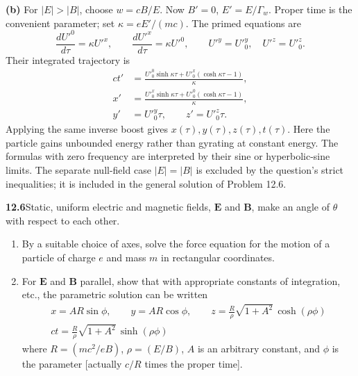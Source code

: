\medskip\noindent\textbf{(b)} For $|E|>|B|$, choose $w=cB/E$.  Now
$B'=0$, $E'=E/\Gamma_w$.  Proper time is the convenient parameter;
set $\kappa=eE'/(mc)$.  The primed equations are
\[
\frac{dU'^0}{d\tau}=\kappa U'^x,\qquad
\frac{dU'^x}{d\tau}=\kappa U'^0,\qquad
U'^y=U'^y_0,\quad U'^z=U'^z_0.
\]
Their integrated trajectory is
\begin{align*}
ct'&=\frac{U'^0_0\sinh\kappa\tau+
 U'^x_0(\cosh\kappa\tau-1)}{\kappa},\\
x'&=\frac{U'^x_0\sinh\kappa\tau+
 U'^0_0(\cosh\kappa\tau-1)}{\kappa},\\
y'&=U'^y_0\tau,\qquad z'=U'^z_0\tau.
\end{align*}
Applying the same inverse boost gives $x(\tau),y(\tau),z(\tau),t(\tau)$.
Here the particle gains unbounded energy rather than gyrating at
constant energy.  The formulas with zero frequency are interpreted
by their sine or hyperbolic-sine limits.  The separate null-field
case $|E|=|B|$ is excluded by the question's strict inequalities;
it is included in the general solution of Problem 12.6.

\par\bigskip
\noindent\textbf{12.6}\quad Static, uniform electric and magnetic fields, $\mathbf{E}$ and $\mathbf{B}$, make an angle of $\theta$ with respect to each other.
\begin{enumerate}
\item[(a)] By a suitable choice of axes, solve the force equation for the motion of a particle of charge $e$ and mass $m$ in rectangular coordinates.
\item[(b)] For $\mathbf{E}$ and $\mathbf{B}$ parallel, show that with appropriate constants of integration, etc., the parametric solution can be written
\begin{gather*}
x=AR\sin\phi,\qquad y=AR\cos\phi,\qquad z=\frac{R}{\rho}\sqrt{1+A^{2}}\,\cosh(\rho\phi)\\[4pt]
ct=\frac{R}{\rho}\sqrt{1+A^{2}}\,\sinh(\rho\phi)
\end{gather*}
where $R=(mc^{2}/eB)$, $\rho=(E/B)$, $A$ is an arbitrary constant, and $\phi$ is the parameter [actually $c/R$ times the proper time].
\end{enumerate}
\solution

